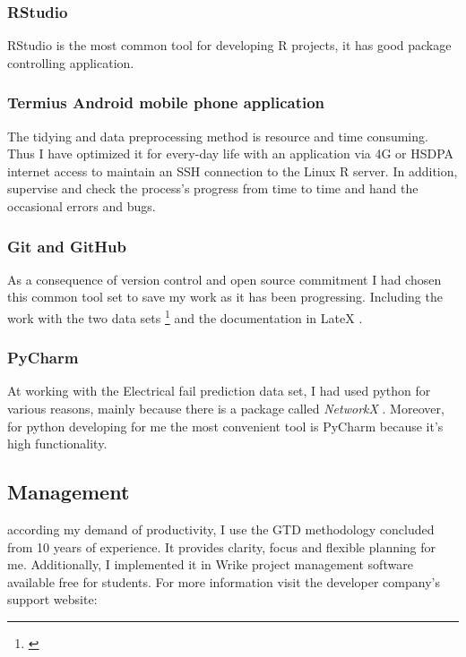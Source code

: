 			\subsubsection{RStudio}
RStudio is the most common tool for developing R projects, it has good package controlling application.
\cite{RStudio}
			\subsubsection{Termius Android mobile phone application}
The tidying and data preprocessing method is resource and time consuming. Thus I have optimized it for every-day life with an application via 4G or HSDPA internet access to maintain an SSH connection to the Linux R server. In addition, supervise and check the process's progress from time to time and hand the occasional errors and bugs.
\cite{Termius}
			\subsubsection{Git and GitHub}
As a consequence of version control and open source commitment I had chosen this common tool set \cite{Github} to save my work as it has been progressing. Including the work with the two data sets \footnote{\cite{GitHub_CAN_RUL,GitHub_FP_RUL}} and the documentation in LateX \cite{GitHub_Thesis_Text}.
			\subsubsection{PyCharm}
At working with the Electrical fail prediction data set, I had used python for various reasons, mainly because there is a package called \textit{NetworkX} \cite{NetworkX}. Moreover, for python developing for me the most convenient tool is PyCharm because it's high functionality.
\cite{PyCharm}	
		\subsection{Management}
according my demand of productivity, I use the GTD\cite{GTD} methodology concluded from 10 years of experience. It provides clarity, focus and flexible planning for me. Additionally, I implemented it in Wrike \cite{WRIKE} project management software available free for students. For more information visit the developer company's support website: \cite{WRIKE_for_students}